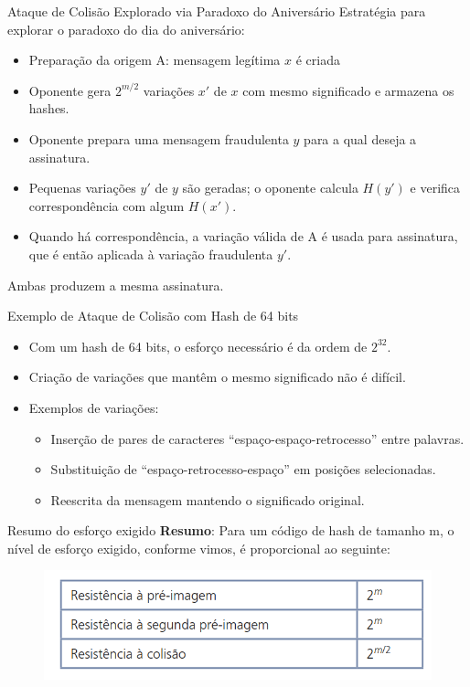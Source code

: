\begin{frame}{Ataque de Colisão Explorado via Paradoxo do Aniversário}
Estratégia para explorar o paradoxo do dia do aniversário:
    \begin{itemize}
        \item Preparação da origem A: mensagem legítima \(x\) é criada
        \item Oponente gera \(2^{m/2}\) variações \(x'\) de \(x\) com mesmo significado e armazena os hashes.
        \item Oponente prepara uma mensagem fraudulenta \(y\) para a qual deseja a assinatura.
        \item Pequenas variações \(y'\) de \(y\) são geradas; o oponente calcula \(H(y')\) e verifica correspondência com algum \(H(x')\).
        \item Quando há correspondência, a variação válida de A é usada para assinatura, que é então aplicada à variação fraudulenta \(y'\). 
    \end{itemize}
    Ambas produzem a mesma assinatura.
\end{frame}
\begin{frame}{Exemplo de Ataque de Colisão com Hash de 64 bits}
    \begin{itemize}
        \item Com um hash de 64 bits, o esforço necessário é da ordem de \(2^{32}\).
        \item Criação de variações que mantêm o mesmo significado não é difícil.
        \item Exemplos de variações:
        \begin{itemize}
            \item Inserção de pares de caracteres ``espaço-espaço-retrocesso'' entre palavras.
            \item Substituição de ``espaço-retrocesso-espaço'' em posições selecionadas.
            \item Reescrita da mensagem mantendo o significado original.
        \end{itemize}
    \end{itemize}
\end{frame}
\begin{frame}{Resumo do esforço exigido}
    \textbf{Resumo}: Para um código de hash de tamanho m, o nível de esforço exigido, conforme vimos, é proporcional ao seguinte:
    \begin{figure}
        \centering
        \includegraphics[width=0.7\linewidth]{Figuras/resumo-do-esforco-exigido.png}
    \end{figure}
\end{frame}
